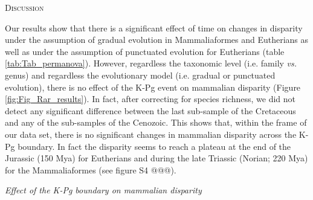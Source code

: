 \documentclass[12pt,letterpaper]{article}
\renewcommand{\section}[1]{%
\bigskip
\begin{center}
\begin{Large}
\normalfont\scshape #1
\medskip
\end{Large}
\end{center}}
\renewcommand{\subsection}[1]{%
\bigskip
\begin{center}
\begin{large}
\normalfont\itshape #1
\end{large}
\end{center}}
\begin{document}
\section{Discussion}
Our results show that there is a significant effect of time on changes in disparity under the assumption of gradual evolution in Mammaliaformes and Eutherians as well as under the assumption of punctuated evolution for Eutherians (table \ref{tab:Tab_permanova}).
However, regardless the taxonomic level (i.e. family \textit{vs.} genus) and regardless the evolutionary model (i.e. gradual or punctuated evolution), there is no effect of the K-Pg event on mammalian disparity (Figure \ref{fig:Fig_Rar_results}).
In fact, after correcting for species richness, we did not detect any significant difference between the last sub-sample of the Cretaceous and any of the sub-samples of the Cenozoic.
This shows that, within the frame of our data set, there is no significant changes in mammalian disparity across the K-Pg boundary.
In fact the disparity seems to reach a plateau at the end of the Jurassic (150 Mya) for Eutherians and during the late Triassic (Norian; 220 Mya) for the Mammaliaformes (see figure S4 @@@). 

\subsection{Effect of the K-Pg boundary on mammalian disparity}
\end{document}
